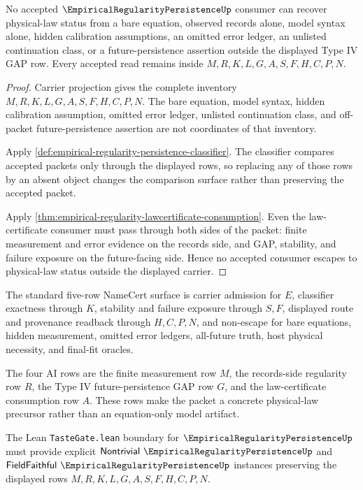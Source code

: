 \begin{theorem}
\label{thm:empirical-regularity-persistence-nonescape}
No accepted $\EmpiricalRegularityPersistenceUp$ consumer can recover physical-law status from a bare equation, observed records alone, model syntax alone, hidden calibration assumptions, an omitted error ledger, an unlisted continuation class, or a future-persistence assertion outside the displayed Type IV GAP row. Every accepted read remains inside $M,R,K,L,G,A,S,F,H,C,P,N$.
\end{theorem}
\begin{proof}
Carrier projection gives the complete inventory $M,R,K,L,G,A,S,F,H,C,P,N$. The bare equation, model syntax, hidden calibration assumption, omitted error ledger, unlisted continuation class, and off-packet future-persistence assertion are not coordinates of that inventory.

Apply \autoref{def:empirical-regularity-persistence-classifier}. The classifier compares accepted packets only through the displayed rows, so replacing any of those rows by an absent object changes the comparison surface rather than preserving the accepted packet.

Apply \autoref{thm:empirical-regularity-lawcertificate-consumption}. Even the law-certificate consumer must pass through both sides of the packet: finite measurement and error evidence on the records side, and GAP, stability, and failure exposure on the future-facing side. Hence no accepted consumer escapes to physical-law status outside the displayed carrier.
\end{proof}

The standard five-row NameCert surface is carrier admission for $E$, classifier exactness through $K$, stability and failure exposure through $S,F$, displayed route and provenance readback through $H,C,P,N$, and non-escape for bare equations, hidden measurement, omitted error ledgers, all-future truth, host physical necessity, and final-fit oracles.

The four AI rows are the finite measurement row $M$, the records-side regularity row $R$, the Type IV future-persistence GAP row $G$, and the law-certificate consumption row $A$. These rows make the packet a concrete physical-law precursor rather than an equation-only model artifact.

The Lean \texttt{TasteGate.lean} boundary for $\EmpiricalRegularityPersistenceUp$ must provide explicit $\mathsf{Nontrivial}\ \EmpiricalRegularityPersistenceUp$ and $\mathsf{FieldFaithful}\ \EmpiricalRegularityPersistenceUp$ instances preserving the displayed rows $M,R,K,L,G,A,S,F,H,C,P,N$.

